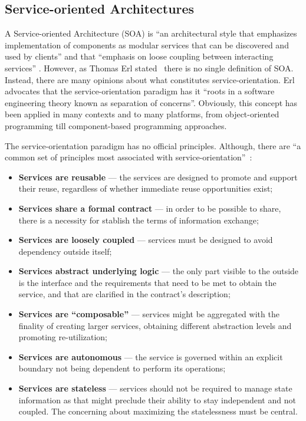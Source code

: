 \subsection{Service-oriented Architectures} \label{sec:soa}


A Service-oriented Architecture (SOA) is ``an architectural style that emphasizes implementation of components as modular services that can be discovered and used by clients'' and that ``emphasis on loose coupling between interacting services'' \citep{Srinivasan2005}. However, as Thomas Erl stated~\citep{Erl2005} there is no single definition of SOA. Instead, there are many opinions about what constitutes service-orientation. Erl advocates that the service-orientation paradigm has it ``roots in a software engineering theory known as separation of concerns''. Obviously, this concept has been applied in many contexts and to many platforms, from object-oriented programming till component-based programming approaches.

The service-orientation paradigm has no official principles. Although, there are ``a common set of principles most associated with service-orientation''~\citep{Erl2005}:
\begin{itemize}
\item \textbf{Services are reusable} --- the services are designed to promote and support their reuse, regardless of whether immediate reuse opportunities exist;
\item \textbf{Services share a formal contract} --- in order to be possible to share, there is a necessity for stablish the terms of information exchange;
\item \textbf{Services are loosely coupled} --- services must be designed to avoid dependency outside itself;
\item \textbf{Services abstract underlying logic} --- the only part visible to the outside is the interface and the requirements that need to be met to obtain the service, and that are clarified in the contract's description;
\item \textbf{Services are ``composable''} --- services might be aggregated with the finality of creating larger services, obtaining different abstraction levels and promoting re-utilization;
\item \textbf{Services are autonomous} --- the service is governed within an explicit boundary not being dependent to perform its operations;
\item \textbf{Services are stateless} --- services should not be required to manage state information as that might preclude their ability to stay independent and not coupled. The concerning about maximizing the statelessness must be central.
\end{itemize}

